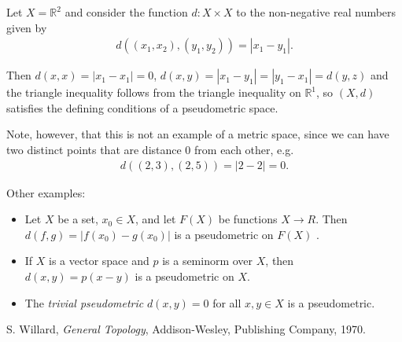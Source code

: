 \documentclass[12pt]{article}
\newcommand{\<}{\langle}
\renewcommand{\>}{\rangle}
\begin{document}
Let $X=\mathbb{R}^2$ and consider the function $d:X\times X$ to the non-negative real numbers given by 
\begin{align*}
d((x_1,x_2),(y_1,y_2))=|x_1-y_1|.
\end{align*}

Then $d(x,x)=|x_1-x_1|=0$, $d(x,y)=|x_1-y_1|=|y_1-x_1|=d(y,z)$ and the triangle inequality follows from the triangle inequality on $\mathbb{R}^1$, so $(X,d)$ satisfies the defining conditions of a pseudometric space.

Note, however, that this is not an example of a metric space, since we can have two distinct points that are distance 0 from each other, e.g.
\begin{align*}
d((2,3),(2,5))=|2-2|=0.
\end{align*}

Other examples:
\begin{itemize}
\item Let $X$ be a set, $x_0\in X$, and let $F(X)$ be functions $X\to R$.
Then $d(f,g)=|f(x_0)-g(x_0)|$
is a pseudometric on $F(X)$ \cite{willard}. 

\item If $X$ is a vector space and $p$ is a seminorm over $X$, then 
$d(x,y)=p(x-y)$ is a pseudometric on $X$.

\item The \emph{trivial pseudometric} $d(x,y)=0$ for all $x,y\in X$ is a
pseudometric. 
\end{itemize}

\begin{thebibliography}{9}
 S. Willard, \emph{General Topology},
Addison-Wesley, Publishing Company, 1970.
\end{thebibliography}
\end{document}
